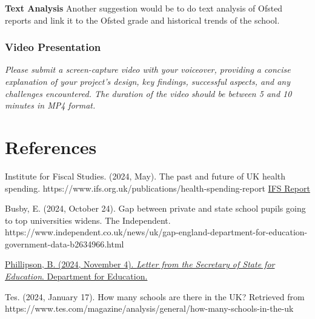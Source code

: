\documentclass[
  letterpaper,
  DIV=11,
  numbers=noendperiod]{scrartcl}
\begin{document}
\textbf{Text Analysis} Another suggestion would be to do text analysis
of Ofsted reports and link it to the Ofsted grade and historical trends
of the school.

\subsubsection{Video Presentation}\label{video-presentation}

\emph{Please submit a screen-capture video with your voiceover,
providing a concise explanation of your project's design, key findings,
successful aspects, and any challenges encountered. The duration of the
video should be between 5 and 10 minutes in MP4 format.}

\section{References}\label{references}

Institute for Fiscal Studies. (2024, May). The past and future of UK
health spending.
https://www.ifs.org.uk/publications/health-spending-report
\href{https://ifs.org.uk/articles/uk-education-system-preserves-inequality-new-report}{IFS
Report}

Busby, E. (2024, October 24). Gap between private and state school
pupils going to top universities widens. The Independent.
https://www.independent.co.uk/news/uk/gap-england-department-for-education-government-data-b2634966.html

\href{Letter\%20from\%20the\%20Education\%20Secretary\%204.11.24\%20(002).pdf}{Phillipson,
B. (2024, November 4). \emph{Letter from the Secretary of State for
Education}. Department for Education.}

Tes. (2024, January 17). How many schools are there in the UK? Retrieved
from
https://www.tes.com/magazine/analysis/general/how-many-schools-in-the-uk
\end{document}
